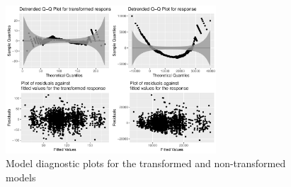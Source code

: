 \documentclass[11pt]{article}
\begin{document}
\begin{figure}[H]
	\centering
	\includegraphics[width=0.7\textwidth]{qqplots}
	\caption{Model diagnostic plots for the transformed and non-transformed models}
	\label{fig:qqplots}
\end{figure}
\end{document}
